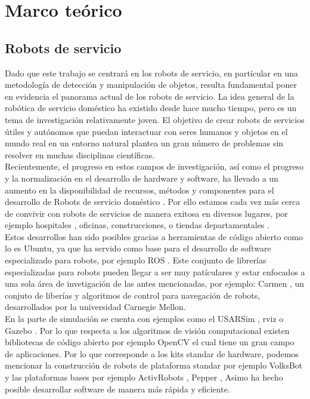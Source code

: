 \documentclass[a4paper, openright, 12pt]{report}
\begin{document}
\chapter{Marco teórico}
	\section{Robots de servicio}


		Dado que este trabajo se centrará en los robots de servicio, en partícular en una metodología de detección y manipulación de objetos, resulta fundamental poner en evidencia el panorama actual de los robots de servicio. La idea general de la robótica de servicio doméstico ha existido desde hace mucho tiempo, pero es un tema de investigación relativamente joven. El objetivo de crear robots de servicios útiles y autónomos que puedan interactuar con seres humanos y objetos en el mundo real en un entorno natural plantea un gran número de problemas sin resolver en muchas disciplinas científicas.\\

		Recientemente, el progreso en estos campos de investigación, así como el progreso y la normalización en el desarrollo de hardware y software, ha llevado a un aumento en la disponibilidad de recursos, métodos y componentes para el desarrollo  de Robots de servicio doméstico . Por ello estamos cada vez más cerca de convivir con robots de servicios de manera exitosa en diversos lugares, por ejemplo hospitales \cite{hospitalRobots}, oficinas, construcciones, o tiendas departamentales \cite{robotsInStores}.\\


		Estos desarrollos han sido posibles gracias a herramientas de código abierto como lo es Ubuntu, ya que ha servido como base para el desarrollo de software especializado para robots, por ejemplo ROS \cite{rosEpage}. Este conjunto de librerías especializadas para robots pueden llegar a ser muy patículares y estar enfocados a una sola área de invetigación de las antes mencionadas, por ejemplo: Carmen \cite{carnegieMellon}, un conjuto de liberías y algoritmos de control para navegación de robots, desarrollados por la universidad Carnegie Mellon\cite{cMellonEpage}.\\

		En la parte de simulación se cuenta con ejemplos como el USARSim \cite{balakirsky2006}, rviz \cite{rVizEpage} o Gazebo \cite{gazeboEpage}. Por lo que respecta a los algoritmos de visión computacional existen bibliotecas de código abierto por ejemplo OpenCV \cite{openCV} el cual tiene un gran campo de aplicaciones\cite{bradski2000}. Por lo que corresponde a los kits standar de hardware, podemos mencionar la construcción de robots de plataforma standar por ejemplo VolksBot \cite{wisspeintner2007} y las plataformas bases por ejemplo ActivRobots \cite{ActivRobots}, Pepper \cite{pepperEpage}, Asimo \cite{asimoEpage} ha hecho posible desarrollar software de manera más rápida y eficiente.\\
\end{document}
